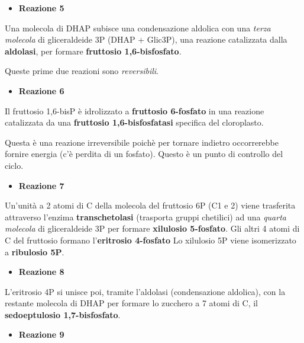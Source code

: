 \documentclass[]{article}
\begin{document}
\begin{itemize}
\itemsep1pt\parskip0pt
\item
  \textbf{Reazione 5}
\end{itemize}

Una molecola di DHAP subisce una condensazione aldolica con una
\emph{terza molecola} di gliceraldeide 3P (DHAP + Glic3P), una reazione
catalizzata dalla \textbf{aldolasi}, per formare \textbf{fruttosio
1,6-bisfosfato}.

Queste prime due reazioni sono \emph{reversibili}.

\begin{itemize}
\itemsep1pt\parskip0pt
\item
  \textbf{Reazione 6}
\end{itemize}

Il fruttosio 1,6-bisP è idrolizzato a \textbf{fruttosio 6-fosfato} in
una reazione catalizzata da una \textbf{fruttosio 1,6-bisfosfatasi}
specifica del cloroplasto.

Questa è una reazione irreversibile poichè per tornare indietro
occorrerebbe fornire energia (c'è perdita di un fosfato). Questo è un
punto di controllo del ciclo.

\begin{itemize}
\itemsep1pt\parskip0pt
\item
  \textbf{Reazione 7}
\end{itemize}

Un'unità a 2 atomi di C della molecola del fruttosio 6P (C1 e 2) viene
trasferita attraverso l'enzima \textbf{transchetolasi} (trasporta gruppi
chetilici) ad una \emph{quarta molecola} di gliceraldeide 3P per formare
\textbf{xilulosio 5-fosfato}. Gli altri 4 atomi di C del fruttosio
formano l'\textbf{eritrosio 4-fosfato} Lo xilulosio 5P viene
isomerizzato a \textbf{ribulosio 5P}.

\begin{itemize}
\itemsep1pt\parskip0pt
\item
  \textbf{Reazione 8}
\end{itemize}

L'eritrosio 4P si unisce poi, tramite l'aldolasi (condensazione
aldolica), con la restante molecola di DHAP per formare lo zucchero a 7
atomi di C, il \textbf{sedoeptulosio 1,7-bisfosfato}.

\begin{itemize}
\itemsep1pt\parskip0pt
\item
  \textbf{Reazione 9}
\end{itemize}
\end{document}
